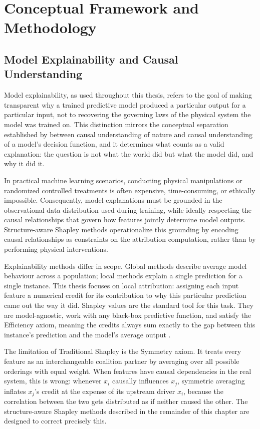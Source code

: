 \documentclass[12pt,a4paper,oneside]{article}
\begin{document}
\section{Conceptual Framework and Methodology}
\label{sec:framework}

\subsection{Model Explainability and Causal Understanding}

Model explainability, as used throughout this thesis, refers to the goal of making transparent why a trained predictive model produced a particular output for a particular input, not to recovering the governing laws of the physical system the model was trained on. This distinction mirrors the conceptual separation established by \citet{Baron2023} between causal understanding of nature and causal understanding of a model's decision function, and it determines what counts as a valid explanation: the question is not what the world did but what the model did, and why it did it.

In practical machine learning scenarios, conducting physical manipulations or randomized controlled treatments is often expensive, time-consuming, or ethically impossible. Consequently, model explanations must be grounded in the observational data distribution used during training, while ideally respecting the causal relationships that govern how features jointly determine model outputs. Structure-aware Shapley methods operationalize this grounding by encoding causal relationships as constraints on the attribution computation, rather than by performing physical interventions.

Explainability methods differ in scope. Global methods describe average model behaviour across a population; local methods explain a single prediction for a single instance. This thesis focuses on local attribution: assigning each input feature a numerical credit for its contribution to why this particular prediction came out the way it did. Shapley values are the standard tool for this task. They are model-agnostic, work with any black-box predictive function, and satisfy the Efficiency axiom, meaning the credits always sum exactly to the gap between this instance's prediction and the model's average output \citep{Lundberg2017}.

The limitation of Traditional Shapley is the Symmetry axiom. It treats every feature as an interchangeable coalition partner by averaging over all possible orderings with equal weight. When features have causal dependencies in the real system, this is wrong: whenever $x_i$ causally influences $x_j$, symmetric averaging inflates $x_j$'s credit at the expense of its upstream driver $x_i$, because the correlation between the two gets distributed as if neither caused the other. The structure-aware Shapley methods described in the remainder of this chapter are designed to correct precisely this.
\end{document}
